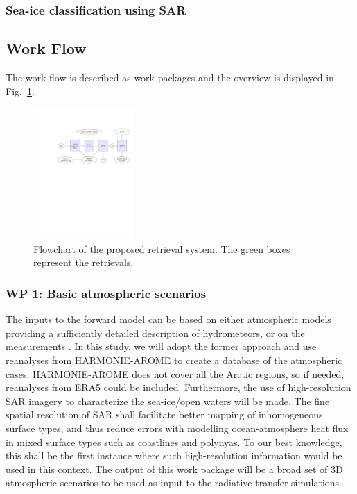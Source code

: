 \documentclass[12pt,oneside,a4paper]{article}
\begin{document}
\subsubsection{Sea-ice classification using SAR}



\subsection{Work Flow}
\label{sec:wp}


The work flow is described as work packages and the overview is displayed in Fig.~\ref{fig:flowchart}. 

\begin{figure}
	\begin{minipage}[c]{0.70\textwidth}
		\includegraphics[trim=140 450 25 125,clip,height = 50mm]{flowchart.pdf}
	\end{minipage}\hfill
	\begin{minipage}[c]{0.28\textwidth}
		\caption{Flowchart of the proposed retrieval system. The green boxes represent the retrievals.
		} \label{fig:flowchart}
	\end{minipage}
\end{figure}

\vspace{-1ex}
\subsubsection*{WP 1: Basic atmospheric scenarios}
%

\label{sec:atmscenes}
The inputs to the forward model can be based on either atmospheric models providing a sufficiently detailed description of hydrometeors, or on the measurements \citep{ekelund:using:20}. In this study, we will adopt the former approach and use reanalyses from HARMONIE-AROME to create a database of the atmospheric cases. HARMONIE-AROME does not cover all the Arctic regions, so if needed, reanalyses from ERA5 could be included. Furthermore, the use of high-resolution SAR imagery to characterize the sea-ice/open waters will be made. The fine spatial resolution of SAR shall facilitate better mapping of inhomogeneous surface types, and thus reduce errors with modelling ocean-atmosphere heat flux in mixed surface types such as coastlines and polynyas. To our best knowledge, this shall be the first instance where such high-resolution information would be used in this context. 
The output of this work package will be a broad set of 3D atmospheric scenarios to be used as input to the radiative transfer simulations.
\vspace{-1.0ex}
\end{document}
